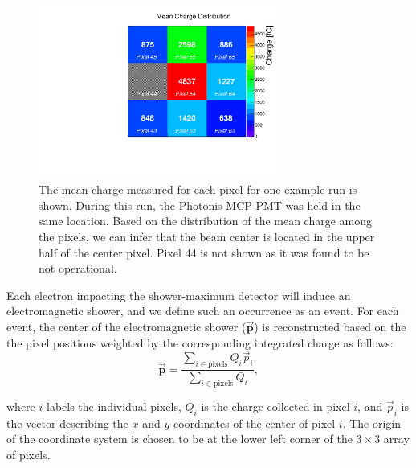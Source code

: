 \begin{figure}[h] 
\centering
\includegraphics[width=8cm]{Images/exavint/exintrun30.pdf} 
\caption{\small The mean charge measured for each pixel for one example run is shown. During this run, the Photonis MCP-PMT was held in the same location. Based on the distribution
of the mean charge among the pixels, we can infer that the beam center is
located in the upper half of the center pixel. Pixel 44 is not shown as it was
found to be not operational. } 
\label{fig:exavint} 
\end{figure} 

Each electron impacting the shower-maximum detector will induce an
electromagnetic shower, and we define such an occurrence as an event. For each
event, the center of the electromagnetic shower ($\vec{\mathbf{{p}}}$) is reconstructed based on the the pixel positions weighted by the corresponding integrated
charge as follows: 
\begin{equation} 
 \vec{\mathbf{{p}}} =
\frac{\sum_{i\in\mathrm{pixels}} Q_{i} \vec{p}_i} {\sum_{i\in\mathrm{pixels}}
Q_{i}}, 
\end{equation} 

where $i$ labels the individual pixels, $Q_{i}$ is the charge collected in pixel
$i$, and $\vec{p}_{i}$ is the vector describing the $x$ and $y$ coordinates of
the center of pixel $i$. The origin of the coordinate system is chosen to be at
the lower left corner of the $3\times3$ array of pixels.

